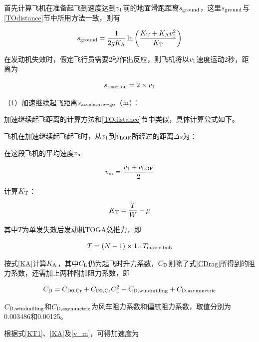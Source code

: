 \documentclass[a4paper,punct,space,heading=true,AutoFakeBold]{ctexrep}
\begin{document}
首先计算飞机在准备起飞到速度达到$v_{\rm 1}$前的地面滑跑距离$s_{\rm ground}$，这里$s_{\rm ground}$与\ref{TOdistance}节中所用方法一致，则有

\begin{equation}
s_{\rm ground}=\frac{1}{2gK_{\rm A}}\ln\left(\frac{K_{\rm T}+K_{\rm A}v_{\rm 1}^2}{K_{\rm T}}\right)
\end{equation}

在发动机失效时，假定飞行员需要2秒作出反应，则飞机将以$v_{\rm 1}$速度运动2秒，距离为

\begin{equation}
s_{\rm reaction}=2\times v_{\rm 1}
\end{equation}

（1）加速继续起飞距离$s_{\rm accelerate-go}$（$\rm m$）：

加速继续起飞距离的计算方法和\ref{TOdistance}节中类似，具体计算公式如下。

飞机在加速继续起飞起飞时，从$v_{\rm 1}$到$v_{\rm LOF}$所经过的距离$\Delta s$为：

在这段飞机的平均速度$v_{\rm m}$

\begin{equation}\label{v_m}
v_{\rm m}=\frac{v_{\rm 1}+v_{\rm LOF}}{2}
\end{equation}

计算$K_{\rm T}$：

\begin{equation}\label{KT1}
K_{\rm T}=\frac{T}{W}-\mu
\end{equation}

其中$T$为单发失效后发动机TOGA总推力，即

\begin{equation}\label{enginefailureT}
T=\left(N-1\right)\times 1.1T_{\rm max,climb}
\end{equation}

按式\ref{KA}计算$K_{\rm A}$，其中$C_{\rm L}$仍为起飞时升力系数，$C_{\rm D}$则除了式\ref{CDrag}所得到的阻力系数，还需加上两种附加阻力系数，即

\begin{equation}\label{enginefailureCD}
C_{\rm D}=C_{\rm D0,Cr}+C_{\rm D2,Cr}C_{\rm L}^2+C_{\rm D,windmilling}+C_{\rm D,asymmetric}
\end{equation}

$C_{\rm D,windmilling}$和$C_{\rm D,asymmetric}$为风车阻力系数和偏航阻力系数，取值分别为0.003486和0.00125。

根据式\ref{KT1}、\ref{KA}及\ref{v_m}，可得加速度为
\end{document}
